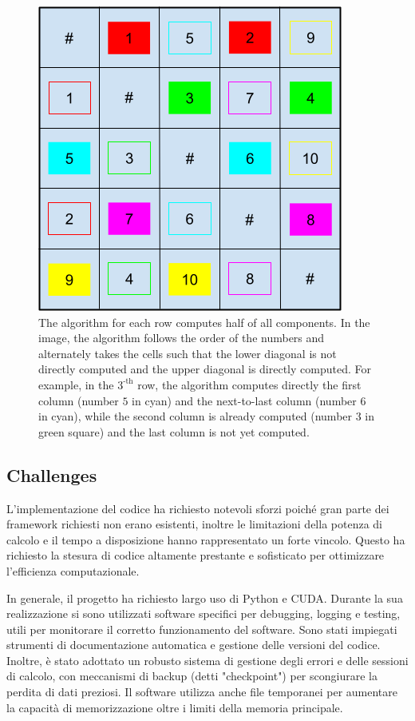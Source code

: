 \begin{toDo}
	\begin{figure}[h]
		\centering
		\includegraphics[width=0.7\linewidth]{Figures/analysis_sort.png}
		\caption[Visit all couples]{The algorithm for each row computes half of all components. In the image, the algorithm follows the order of the numbers and alternately takes the cells such that the lower diagonal is not directly computed and the upper diagonal is directly computed. For example, in the $3^\text{-th}$ row, the algorithm computes directly the first column (number $5$ in cyan) and the next-to-last column (number $6$ in cyan), while the second column is already computed (number $3$ in green square) and the last column is not yet computed.}
		\label{fig:distance_computation}
	\end{figure}

	\subsection{Challenges}
	L'implementazione del codice ha richiesto notevoli sforzi poiché gran parte dei framework richiesti non erano esistenti, inoltre le limitazioni della potenza di calcolo e il tempo a disposizione hanno rappresentato un forte vincolo. Questo ha richiesto la stesura di codice altamente prestante e sofisticato per ottimizzare l'efficienza computazionale.

	\noindent In generale, il progetto ha richiesto largo uso di \gls{Python} e \gls{CUDA}. Durante la sua realizzazione si sono utilizzati software specifici per debugging, logging e testing, utili per monitorare il corretto funzionamento del software. Sono stati impiegati strumenti di documentazione automatica e gestione delle versioni del codice. Inoltre, è stato adottato un robusto sistema di gestione degli errori e delle sessioni di calcolo, con meccanismi di backup (detti "checkpoint") per scongiurare la perdita di dati preziosi. Il software utilizza anche file temporanei per aumentare la capacità di memorizzazione oltre i limiti della memoria principale.


\end{toDo}
